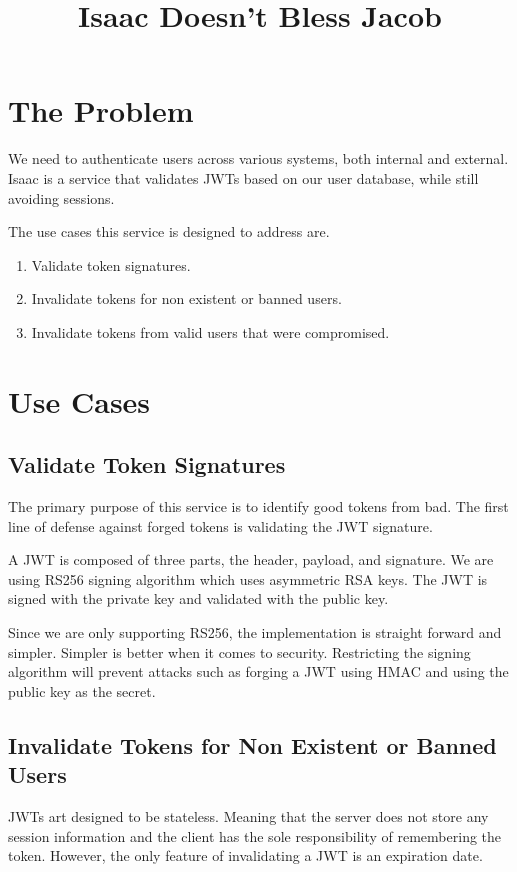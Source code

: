 \documentclass[11pt]{article}
\title{Isaac Doesn't Bless Jacob}
\begin{document}
\maketitle
\section{The Problem}

We need to authenticate users across various systems, both internal and external.
Isaac is a service that validates JWTs based on our user database, while
still avoiding sessions.

The use cases this service is designed to address are.
\begin{enumerate}
    \item Validate token signatures.
    \item Invalidate tokens for non existent or banned users.
    \item Invalidate tokens from valid users that were compromised. 
\end{enumerate}

\section{Use Cases}
\subsection{Validate Token Signatures}

The primary purpose of this service is to identify good tokens from bad. The first
line of defense against forged tokens is validating the JWT signature.

A JWT is composed of three parts, the header, payload, and signature.
We are using RS256 signing algorithm which uses asymmetric RSA keys. The JWT
is signed with the private key and validated with the public key.

Since we are only supporting RS256, the implementation is straight forward and
simpler. Simpler is better when it comes to security. Restricting the signing 
algorithm will prevent attacks such as forging a JWT using HMAC and using
the public key as the secret.

\subsection{Invalidate Tokens for Non Existent or Banned Users}

JWTs art designed to be stateless. Meaning that the server does not store any 
session information and the client has the sole responsibility of remembering the
token. However, the only feature of invalidating a JWT is an expiration date. 
\end{document}

